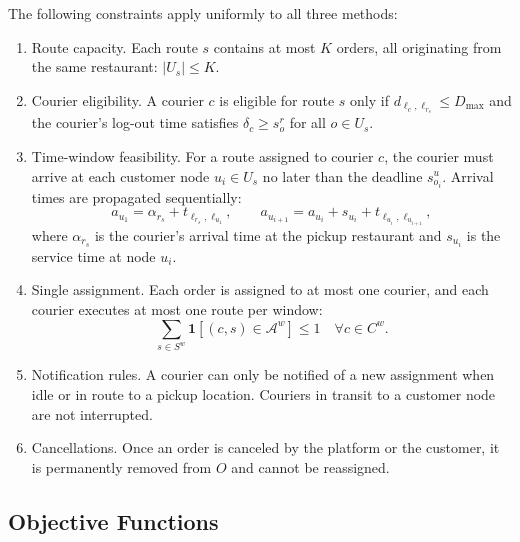 \documentclass[runningheads]{llncs}
\begin{document}
The following constraints apply uniformly to all three methods:

\begin{enumerate}
    \item Route capacity.
    Each route $s$ contains at most $K$ orders, all originating
    from the same restaurant: $|U_s| \leq K$.

    \item Courier eligibility.
    A courier $c$ is eligible for route $s$ only if
    $d_{\ell_c, \ell_{r_s}} \leq D_{\max}$ and the courier's
    log-out time satisfies $\delta_c \geq s^r_{o}$
    for all $o \in U_s$.

    \item Time-window feasibility.
    For a route assigned to courier $c$, the courier must arrive
    at each customer node $u_i \in U_s$ no later than the
    deadline $s^u_{o_i}$.
    Arrival times are propagated sequentially:
    \begin{equation}
        a_{u_1} = \alpha_{r_s} + t_{\ell_{r_s}, \ell_{u_1}},
        \qquad
        a_{u_{i+1}} = a_{u_i} + s_{u_i} + t_{\ell_{u_i}, \ell_{u_{i+1}}},
    \end{equation}
    where $\alpha_{r_s}$ is the courier's arrival time at the
    pickup restaurant and $s_{u_i}$ is the service time at node $u_i$.

    \item Single assignment.
    Each order is assigned to at most one courier,
    and each courier executes at most one route per window:
    \begin{equation}
        \sum_{s \in S^w} \mathbf{1}[(c,s) \in \mathcal{A}^w] \leq 1
        \quad \forall c \in C^w.
    \end{equation}

    \item Notification rules.
    A courier can only be notified of a new assignment when
    idle or in route to a pickup location.
    Couriers in transit to a customer node are not interrupted.

    \item Cancellations.
    Once an order is canceled by the platform or the customer,
    it is permanently removed from $O$ and cannot be reassigned.
\end{enumerate}


\subsection{Objective Functions}\label{subsec:objectives}
\end{document}
